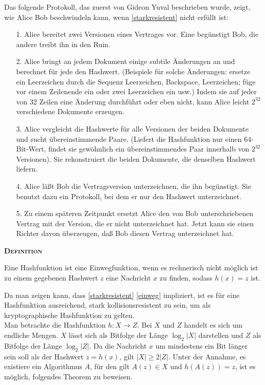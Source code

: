 \documentclass[12pt,a4paper]{scrartcl}
\numberwithin{equation}{section}
\newcounter{myalgctr}
\newenvironment{mydef}{%
	\bigskip\noindent%
	\refstepcounter{myalgctr}%
	\textsc{\textbf{Definition} \themyalgctr}%
	\newline
}{\par\bigskip}  %
\numberwithin{myalgctr}{section}
\numberwithin{mytheoremctr}{section}
\begin{document}
\vspace{.5cm}

\noindent
Das folgende Protokoll, das zuerst von Gideon Yuval beschrieben wurde, zeigt, wie Alice Bob beschwindeln kann, wenn \cref{starkresistent} nicht erfüllt ist:\\
\autocite[Protokoll wörtlich übernommen.][S. 491~f.]{angewandteKryptographie}

\begin{itemize}
	\item[1.]
	Alice bereitet zwei Versionen eines Vertrages vor. Eine begünstigt Bob, die andere treibt ihn in den Ruin.
	
	\item[2.]
	Alice bringt an jedem Dokument einige subtile Änderungen an und berechnet für jede den Hashwert. (Beispiele für solche Änderungen: ersetze ein Leerzeichen durch die Sequenz Leerzeichen, Backspace, Leerzeichen; füge vor einem Zeilenende ein oder zwei Leerzeichen ein usw.) Indem sie auf jeder von 32 Zeilen eine Änderung durchführt oder eben nicht, kann Alice leicht $2^{32}$ verschiedene Dokumente erzeugen.
	
	\item[3.]
	Alice vergleicht die Hashwerte für alle Versionen der beiden Dokumente und sucht übereinstimmende Paare. (Liefert die Hashfunktion nur einen 64-Bit-Wert, findet sie gewöhnlich ein übereinstimmendes Paar innerhalb von $2^{32}$ Versionen). Sie rekonstruiert die beiden Dokumente, die denselben Hashwert liefern.
	
	\item[4.]
	Alice läßt Bob die Vertragsversion unterzeichnen, die ihn begünstigt. Sie benutzt dazu ein Protokoll, bei dem er nur den Hashwert unterzeichnet.
	
	\item[5.]
	Zu einem späteren Zeitpunkt ersetzt Alice den von Bob unterschriebenen Vertrag mit der Version, die er nicht unterzeichnet hat. Jetzt kann sie einen Richter davon überzeugen, daß Bob diesen Vertrag unterzeichnet hat.
\end{itemize}


\begin{mydef}
	Eine Hashfunktion ist eine Einwegfunktion, wenn es rechnerisch nicht möglich ist zu einem gegebenen Hashwert $z$ eine Nachricht $x$ zu finden, sodass $h(x) = z$ ist.\label{einweg} \autocite[vgl.][234]{cryptography}
\end{mydef}
\noindent
Da man zeigen kann, dass \cref{starkresistent} \cref{einweg} impliziert, ist es für eine Hashfunktion ausreichend, stark kollisionsresistent zu sein, um als kryptographische Hashfunktion zu gelten.\\
Man betrachte die Hashfunktion $h: X\rightarrow Z$. Bei $X$ und $Z$ handelt es sich um endliche Mengen. $X$ lässt sich als Bitfolge der Länge $\log_2|X|$ darstellen und $Z$ als Bitfolge der Länge $\log_2|Z|$. Da die Nachricht $x$ um mindestens ein Bit länger sein soll als der Hashwert $z = h(x)$, gilt $|X| \geq 2|Z|$. Unter der Annahme, es existiere ein Algorithmus $A$, für den gilt $A(z) \in X$ und $h(A(z)) = z$, ist es möglich, folgendes Theorem zu beweisen. \autocite[vgl.][S. 234]{cryptography}
\end{document}
